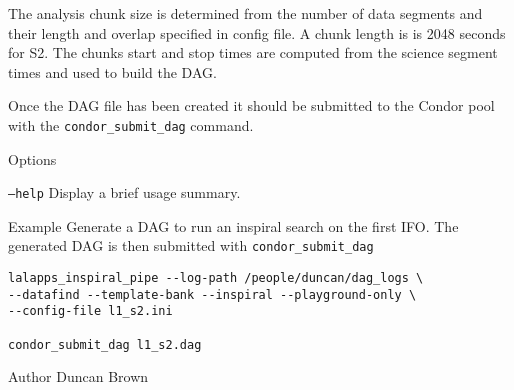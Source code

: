 \begin{entry}
The analysis chunk size is determined from the number of data segments and
their length and overlap specified in config file. A chunk length is 
is 2048 seconds for S2.  The chunks start and stop times are computed
from the science segment times and used to build the DAG.

Once the DAG file has been created it should be submitted to the Condor
pool with the \verb$condor_submit_dag$ command.

\item[Options]\leavevmode
\begin{entry}
\item[\texttt{--help}] Display a brief usage summary.
\end{entry}

\item[Example]
Generate a DAG to run an inspiral search on the first IFO. The generated
DAG is then submitted with \texttt{condor\_submit\_dag}
\begin{verbatim}
lalapps_inspiral_pipe --log-path /people/duncan/dag_logs \
--datafind --template-bank --inspiral --playground-only \
--config-file l1_s2.ini

condor_submit_dag l1_s2.dag
\end{verbatim}

\item[Author] 
Duncan Brown
\end{entry}

